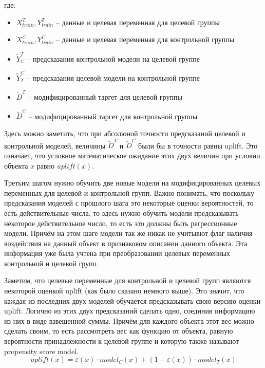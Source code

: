где:
\begin{itemize}
    \item $X_{train}^T, Y_{train}^T$ -- данные и целевая переменная для целевой группы
    \item $X_{train}^C, Y_{train}^C$ -- данные и целевая переменная для контрольной группы 
    \item $\widetilde{Y}^T_C$ -- предсказания контрольной модели на целевой группе
    \item $\widetilde{Y}^C_T$ -- предсказания целевой модели на контрольной группе
    \item $\widetilde{D}^T$ -- модифицированный таргет для целевой группы
    \item $\widetilde{D}^C$ -- модифицированный таргет для контрольной группы
\end{itemize}

Здесь можно заметить, что при абсолюной точности предсказаний целевой и контрольной моделей, величины $\widetilde{D}^T$ и $\widetilde{D}^C$ были бы в точности равны uplift. Это означает, что условное математическое ожидание этих двух величин при условии объекта $x$ равно $uplift(x)$.

Третьим шагом нужно обучить две новые модели на модифицированных целевых переменных для целевой и контрольной групп. Важно понимать, что поскольку предсказания моделей с прошлого шага это некоторые оценки вероятностей, то есть действительные числа, то здесь нужно обучить модели предсказывать некоторое действительное число, то есть это должны быть регрессионные модели. Причём на этом шаге модели так же никак не учитывют флаг наличия воздействия на данный объект в признаковом описании данного объекта. Эта информация уже была учтена при преобразовании целевых переменных контрольной и целевой групп.

Заметим, что целевые переменные для контрольной и целевой групп являются некоторой оценкой uplift (как было сказано немного выше). Это значит, что каждая из последних двух моделей обучается предсказывать свою версию оценки uplift. Логично из этих двух предсказаний сделать одно, соединив информацию из них в виде взвешенной суммы. Причём для каждого объекта этот вес можно сделать своим, то есть рассмотреть вес как функцию от объекта, равную вероятности принадлежности к целевой группе и которую также называют propensity score model.
$$
    uplift(x) =
        \varepsilon(x) \cdot model_C(x)
        +
        (1 - \varepsilon(x)) \cdot model_T(x)
$$





